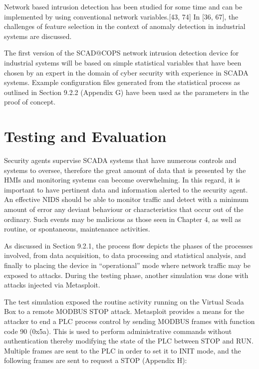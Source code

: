\documentclass[11pt,]{article}
\begin{document}
Network based intrusion detection has been studied for some time and can
be implemented by using conventional network variables.{[}43, 74{]} In
{[}36, 67{]}, the challenges of feature selection in the context of
anomaly detection in industrial systems are discussed.

The first version of the SCAD@COPS network intrusion detection device
for industrial systems will be based on simple statistical variables
that have been chosen by an expert in the domain of cyber security with
experience in SCADA systems. Example configuration files generated from
the statistical process as outlined in Section 9.2.2 (Appendix G) have
been used as the parameters in the proof of concept.

\clearpage

\section{Testing and Evaluation}\label{testing-and-evaluation}

Security agents supervise SCADA systems that have numerous controls and
systems to oversee, therefore the great amount of data that is presented
by the HMIs and monitoring systems can become overwhelming. In this
regard, it is important to have pertinent data and information alerted
to the security agent. An effective NIDS should be able to monitor
traffic and detect with a minimum amount of error any deviant behaviour
or characteristics that occur out of the ordinary. Such events may be
malicious as those seen in Chapter 4, as well as routine, or
spontaneous, maintenance activities.

As discussed in Section 9.2.1, the process flow depicts the phases of
the processes involved, from data acquisition, to data processing and
statistical analysis, and finally to placing the device in
``operational'' mode where network traffic may be exposed to attacks.
During the testing phase, another simulation was done with attacks
injected via Metasploit.

The test simulation exposed the routine activity running on the Virtual
Scada Box to a remote MODBUS STOP attack. Metasploit provides a means
for the attacker to end a PLC process control by sending MODBUS frames
with function code 90 (0x5a). This is used to perform administrative
commands without authentication thereby modifying the state of the PLC
between STOP and RUN. Multiple frames are sent to the PLC in order to
set it to INIT mode, and the following frames are sent to request a STOP
(Appendix H):
\end{document}
